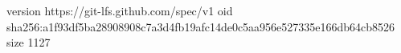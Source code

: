 version https://git-lfs.github.com/spec/v1
oid sha256:a1f93df5ba28908908c7a3d4fb19afc14de0c5aa956e527335e166db64cb8526
size 1127
